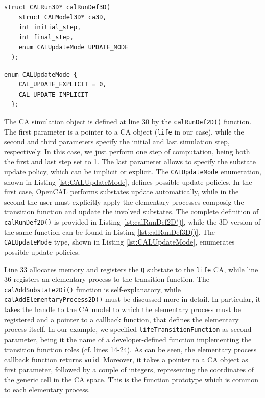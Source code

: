 \begin{lstlisting}[float, label=lst:calRunDef3D(), caption=Definition of the calRunDef3D() function., numbers=none]
  struct CALRun3D* calRunDef3D(
    struct CALModel3D* ca3D,
    int initial_step,
    int final_step,
    enum CALUpdateMode UPDATE_MODE
  );	
\end{lstlisting}

\begin{lstlisting}[float, label=lst:CALUpdateMode, caption=The CALUpdateMode enum type., numbers=none]
  enum CALUpdateMode {
    CAL_UPDATE_EXPLICIT = 0,
    CAL_UPDATE_IMPLICIT
  };
\end{lstlisting}


The CA simulation object is defined at line 30 by the
\verb'calRunDef2D()' function. The first parameter is a pointer to a
CA object (\verb'life' in our case), while the second and third
parameters specify the initial and last simulation step,
respectively. In this case, we just perform one step of computation,
being both the first and last step set to 1. The last parameter allows
to specify the substate update policy, which can be implicit or
explicit. The \verb'CALUpdateMode' enumeration, shown in Listing
\ref{lst:CALUpdateMode}, defines possible update policies. In the
first case, OpenCAL performs substates update automatically, while in
the second the user must explicitly apply the elementary processes
composig the transition function and update the involved
substates. The complete definition of \verb'calRunDef2D()' is provided
in Listing \ref{lst:calRunDef2D()}, while the 3D version of the same
function can be found in Listing \ref{lst:calRunDef3D()}. The
\verb'CALUpdateMode' type, shown in Listing \ref{lst:CALUpdateMode},
enumerates possible update policies.


Line 33 allocates memory and registers the \verb'Q' substate to the
\verb'life' CA, while line 36 registers an elementary process to the
transition function. The \verb'calAddSubstate2Di()' function is
self-explanatory, while \verb'calAddElementaryProcess2D()' must be
discussed more in detail. In particular, it takes the handle to the CA
model to which the elementary process must be registered and a pointer
to a callback function, that defines the elementary process itself. In
our example, we specified \verb'lifeTransitionFunction' as second
parameter, being it the name of a developer-defined function
implementing the transition function roles (cf. lines 14-24). As can
be seen, the elementary process callback function returns
\verb'void'. Moreover, it takes a pointer to a CA object as first
parameter, followed by a couple of integers, representing the
coordinates of the generic cell in the CA space. This is the function
prototype which is common to each elementary process.

